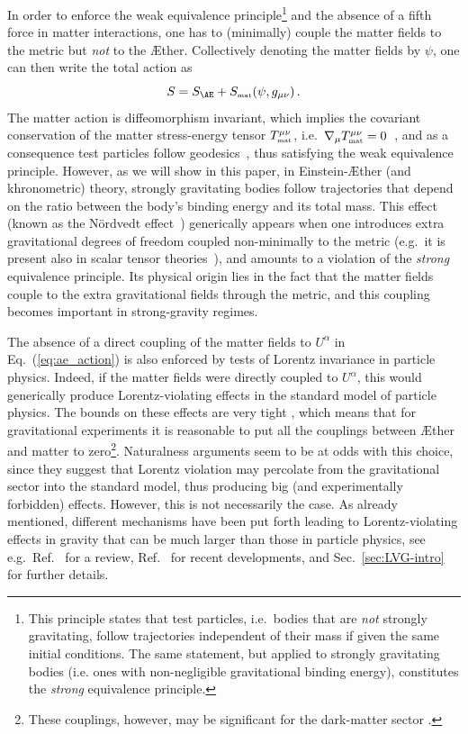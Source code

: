 \documentclass[prd,aps,twocolumn,nofootinbib,showpacs,superscriptaddress]{revtex4-1}
\newcommand\be{\begin{equation}}
\newcommand\ee{\end{equation}}
\def\m{\mu}
\def\n{\nu}
\newcommand{\MAT}{{\mbox{\tiny mat}}}
\begin{document}
In order to enforce the weak equivalence principle\footnote{This principle states
that test particles, i.e.~bodies that are \textit{not} strongly
gravitating, follow trajectories independent of their mass if given
the same initial conditions. The same statement, but applied to strongly gravitating bodies (i.e. ones
with non-negligible gravitational binding energy), constitutes the \textit{strong} equivalence principle.} and the
absence of a fifth force in matter interactions,
one has to (minimally) couple the
matter fields to the metric but \textit{not} to the \AE ther.
Collectively denoting the matter fields by $\psi$, one can then write
the total action as 
\be 
\label{eq:ae_action}
S=S_{\AE}+S_{\MAT} (\psi,g_{\m\n})\,.
\ee
The matter action is  diffeomorphism invariant,
which implies the covariant conservation of the matter stress-energy
tensor $T^{\mu\nu}_\MAT$, i.e.~$\nabla_\mu
T^{\mu\nu}_\MAT=0$~\cite{Wald:1984cw}, and as a consequence test
particles follow geodesics~\cite{Poisson:2011nh}, thus satisfying the
weak equivalence principle.  However, as we will show in this paper,
in Einstein-\AE ther (and khronometric) theory, strongly gravitating bodies follow trajectories
that depend on the ratio between the body's binding energy and its
total mass.  This effect (known as the N\"ordvedt 
effect~\cite{nordvedt,nordvedt_dickes_interpretation}) generically
appears  when one introduces extra gravitational degrees of freedom
coupled non-minimally  to the metric (e.g.~it is present also in scalar
tensor theories~\cite{will-living}), and amounts to a violation of the
\textit{strong} equivalence principle. Its physical origin lies in the
fact that the matter fields couple to the extra gravitational fields
through the metric, and this coupling becomes important in
strong-gravity regimes.

The absence of a direct coupling of the matter fields to $U^{\alpha}$ in
Eq.~(\ref{eq:ae_action}) is also enforced 
by tests of Lorentz invariance in particle physics. Indeed, 
if the matter fields were directly coupled to $U^{\alpha}$, this would generically produce
Lorentz-violating effects in the standard model of particle physics. The
bounds on these effects are very tight \cite{Mattingly:2005re,Kostelecky:2008ts}, 
which means that for gravitational experiments it is reasonable to put all the
couplings between \AE ther and matter to zero\footnote{These couplings, however, may be significant for the
dark-matter sector \cite{Blas:2012vn}.}.
Naturalness arguments seem to be at odds with this choice, since they suggest that Lorentz violation may percolate from the gravitational sector into 
the standard model, thus producing
big (and experimentally forbidden) effects. 
However, this is not necessarily the case. As already mentioned, different
 mechanisms have been put forth leading to Lorentz-violating
effects in gravity that can be much larger than those in
particle physics, see e.g.~Ref.~\cite{Liberati:2013xla} for a review,  Ref.~\cite{Bednik:2013nxa} for recent developments, 
and Sec.~\ref{sec:LVG-intro} for further details. 
\end{document}
